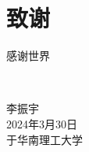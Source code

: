 \chapter{致\texorpdfstring{\quad}{}谢}
感谢世界

~\\

\begin{minipage}[t]{0.945\textwidth}%
	\begin{flushright}
		李振宇\\
		2024年3月30日\\	%
		于华南理工大学
		\par\end{flushright}
\end{minipage}
